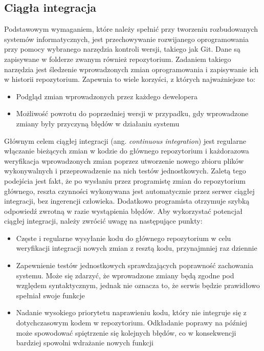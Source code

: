 \subsection{Ciągła integracja}

Podstawowym wymaganiem, które należy spełnić przy tworzeniu rozbudowanych systemów 
informatycznych, jest przechowywanie rozwijanego oprogramowania przy pomocy wybranego 
narzędzia kontroli wersji, takiego jak Git. Dane są zapisywane w folderze zwanym 
również repozytorium. Zadaniem takiego narzędzia jest śledzenie wprowadzonych zmian 
oprogramowania i zapisywanie ich w historii repozytorium. Zapewnia to wiele 
korzyści, z których najważniejsze to:

\begin{itemize} %
    \item Podgląd zmian wprowadzonych przez każdego dewelopera
    \item Możliwość powrotu do poprzedniej wersji w przypadku, gdy wprowadzone zmiany 
    były przyczyną błędów w działaniu systemu
\end{itemize}

Głównym celem ciągłej integracji (ang. \textit{continuous integration}) jest regularne włączanie 
bieżących zmian w kodzie do głównego repozytorium i każdorazowa weryfikacja 
wprowadzonych zmian poprzez utworzenie nowego zbioru plików wykonywalnych 
i przeprowadzenie na nich testów jednostkowych. Zaletą tego podejścia jest fakt, że 
po wysłaniu przez programistę zmian do repozytorium głównego, reszta czynności 
wykonywana jest automatycznie przez serwer ciągłej integracji, bez ingerencji 
człowieka. Dodatkowo programista otrzymuje szybką odpowiedź zwrotną w razie 
wystąpienia błędów.
Aby wykorzystać potencjał ciągłej integracji, należy zwrócić uwagę na następujące 
punkty: 

\begin{itemize} %
    \item Częste i regularne wysyłanie kodu do głównego repozytorium w celu weryfikacji 
    integracji nowych zmian z resztą kodu, przynajmniej raz dziennie 
    \item Zapewnienie testów jednostkowych sprawdzających poprawność zachowania systemu. 
    Może się zdarzyć, że wprowadzone zmiany będą zgodne pod względem 
    syntaktycznym, jednak nie oznacza to, że serwis będzie prawidłowo spełniał swoje 
    funkcje 
    \item Nadanie wysokiego priorytetu naprawieniu kodu, który nie integruje się z 
    dotychczasowym kodem w repozytorium. Odkładanie poprawy na później może spowodować 
    spiętrzenie się kolejnych błędów, co w konsekwencji bardziej spowolni wdrażanie 
    nowych funkcji
\end{itemize}

